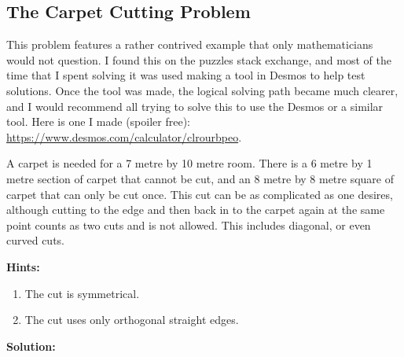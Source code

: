 
\subsection{The Carpet Cutting Problem}

This problem features a rather contrived example that only mathematicians would not question. I found this on the puzzles stack exchange, and most of the time that I spent solving it was used making a tool in Desmos to help test solutions. Once the tool was made, the logical solving path became much clearer, and I would recommend all trying to solve this to use the Desmos or a similar tool. Here is one I made (spoiler free): \url{https://www.desmos.com/calculator/clrourbpeo}.

A carpet is needed for a 7 metre by 10 metre room. There is a 6 metre by 1 metre section of carpet that cannot be cut, and an 8 metre by 8 metre square of carpet that can only be cut once. This cut can be as complicated as one desires, although cutting to the edge and then back in to the carpet again at the same point counts as two cuts and is not allowed. This includes diagonal, or even curved cuts.

\textbf{Hints:}

\begin{enumerate}
    \item The cut is symmetrical.
    \item The cut uses only orthogonal straight edges.
\end{enumerate}

\textbf{Solution:}

\newpage

